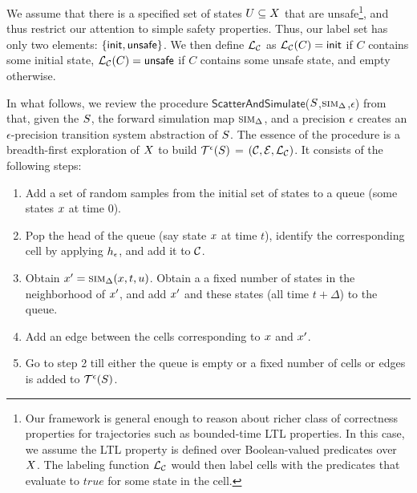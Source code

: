 We assume that there is a specified set of states $U
\subseteq X$ that are unsafe\footnote{Our framework is
general enough to reason about richer class of correctness properties
for trajectories such as bounded-time LTL properties. In this case, we
assume the LTL property is defined over Boolean-valued predicates over
$X$. The labeling function $\mathcal{L}_\mathcal{C}$ would
then label cells with the predicates that evaluate to $\mathit{true}$
for some state in the cell.}, and thus restrict our attention to
simple safety properties. Thus, our label set has only two elements:
$\{\mathsf{init},\mathsf{unsafe}\}$. We then define $\mathcal{L}_\mathcal{C}$ as
$\mathcal{L}_\mathcal{C}(C) = \mathsf{init}$ if $C$ contains some initial state,
$\mathcal{L}_\mathcal{C}(C) = \mathsf{unsafe}$ if $C$ contains some unsafe
state, and empty otherwise.

In what follows, we review the procedure
$\mathsf{ScatterAndSimulate}$($S$,$\mbox{\sc sim}_\Delta$,$\epsilon$)
from \cite{zutshi2014multiple} that, given the $S$, the forward
simulation map $\mbox{\sc sim}_\Delta$, and a precision $\epsilon$ creates an
$\epsilon$-precision transition system abstraction of $S$.  The
essence of the procedure is a breadth-first exploration of
$X$ to build $\mathcal{T}^{\epsilon}(S)$ =
$(\mathcal{C},\mathcal{E},\mathcal{L}_\mathcal{C})$. It consists of the
following steps:
\begin{enumerate}
\item
Add a set of random samples from the initial set of states to a queue
(\ie some states $x$ at time $0$).
\item
Pop the head of the queue (say state $x$ at time $t$), identify
the corresponding cell by applying $h_\epsilon$, and add it to
$\mathcal{C}$.
\item
Obtain $x' = \mbox{\sc sim}_\Delta(x, t, u)$. Obtain a a
fixed number of states in the neighborhood of $x'$, and add
$x'$ and these states (all time $t+\Delta$) to the queue.
\item
Add an edge between the cells corresponding to $x$ and
$x'$.
\item
Go to step 2 till either the queue is empty or a fixed number of cells
or edges is added to $\mathcal{T}^{\epsilon}(S)$.
\end{enumerate}


